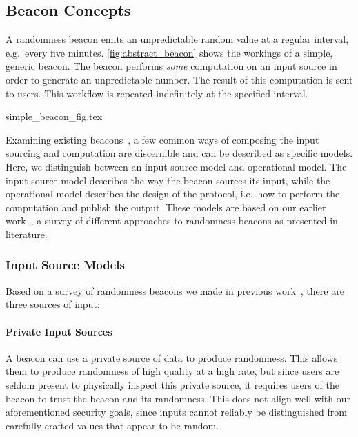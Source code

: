 \subsection{Beacon Concepts}

A randomness beacon emits an unpredictable random value at a regular interval, e.g.\ every five minutes.
\cref{fig:abstract_beacon} shows the workings of a simple, generic beacon.
The beacon performs \emph{some} computation on an input source in order to generate an unpredictable number.
The result of this computation is sent to users.
This workflow is repeated indefinitely at the specified interval.

{simple_beacon_fig.tex}

Examining existing beacons~\cite{nistbeacon,randomzoo,bentov2016bitcoin,fischer2011publicrandomnessservice,bonneau2015bitcoin,baigneres2015trap,clark2010use,randao,bunz2017proofsof,syta2017scalable,cascudo2017scrape}, a few common ways of composing the input sourcing and computation are discernible and can be described as specific models.
Here, we distinguish between an input source model and operational model.
The input source model describes the way the beacon sources its input, while the operational model describes the design of the protocol, i.e.\ how to perform the computation and publish the output.
These models are based on our earlier work~\cite{worldsbestpaper}, a survey of different approaches to randomness beacons as presented in literature.

\subsubsection{Input Source Models}
Based on a survey of randomness beacons we made in previous work~\cite{worldsbestpaper}, there are three sources of input:

\paragraph{Private Input Sources}
A beacon can use a private source of data to produce randomness.
This allows them to produce randomness of high quality at a high rate, but since users are seldom present to physically inspect this private source, it requires users of the beacon to trust the beacon and its randomness.
This does not align well with our aforementioned security goals, since inputs cannot reliably be distinguished from carefully crafted values that appear to be random.


